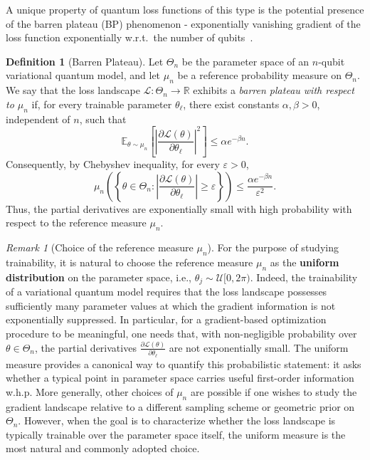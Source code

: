 \documentclass{article}
\theoremstyle{plain}
\theoremstyle{definition}
\newtheorem{definition}[theorem]{Definition}
\theoremstyle{remark}
\newtheorem{remark}[theorem]{Remark}
\begin{document}

A unique property of quantum loss functions of this type is the potential presence of the barren plateau (BP) phenomenon - exponentially vanishing gradient of the loss function exponentially w.r.t.~the number of qubits~\cite{mcclean18}. 
\begin{definition}[Barren Plateau]
Let $\Theta_n$ be the parameter space of an $n$-qubit variational quantum
model, and let $\mu_n$ be a reference probability measure on $\Theta_n$.
We say that the loss landscape $\mathcal L:\Theta_n \to \mathbb{R}$ exhibits a \emph{barren plateau with respect to $\mu_n$} if, for every trainable parameter $\theta_\ell$, there exist constants $\alpha,\beta>0$, independent of $n$, such that
$$
\mathbb E_{\theta\sim\mu_n}
\left[
\left|
\frac{\partial \mathcal L(\theta)}{\partial \theta_\ell}
\right|^2
\right]
\le \alpha e^{-\beta n}.
$$
Consequently, by Chebyshev inequality, for every $\varepsilon>0$,
$$
\mu_n\left(
\left\{
\theta\in\Theta_n:
\left|
\frac{\partial \mathcal L(\theta)}{\partial \theta_\ell}
\right|
\ge \varepsilon
\right\}
\right)
\le
\frac{\alpha e^{-\beta n}}{\varepsilon^2}.
$$
Thus, the partial derivatives are exponentially small with high probability
with respect to the reference measure $\mu_n$.
\end{definition}
\begin{remark}[Choice of the reference measure $\mu_n$]
    For the purpose of studying trainability, it is natural to choose the reference measure $\mu_n$ as the \textbf{uniform distribution} on the parameter space, i.e., $\theta_j \sim \mathcal{U}[0,2\pi)$. Indeed, the trainability of a variational quantum model requires that the loss landscape possesses sufficiently many parameter values at which the gradient information is not exponentially suppressed. In particular, for a gradient-based optimization procedure to be meaningful, one needs that, with non-negligible probability over $\theta\in\Theta_n$, the partial derivatives $\frac{\partial \mathcal L(\theta)}{\partial \theta_\ell}$ are not exponentially small. The uniform measure provides a canonical way to quantify this probabilistic statement: it asks whether a typical point in parameter space carries useful first-order information w.h.p. More generally, other choices of $\mu_n$ are possible if one wishes to study the gradient landscape relative to a different sampling scheme or geometric prior on $\Theta_n$. However, when the goal is to characterize whether the loss landscape is typically trainable over the parameter space itself, the uniform measure is the most natural and commonly adopted choice.
\end{remark}
\end{document}
